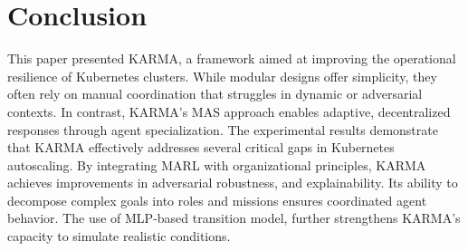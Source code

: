 \documentclass[conference]{IEEEtran}
\begin{document}

\section{Conclusion}
\label{sec:conclusion}

This paper presented KARMA, a framework aimed at improving the operational resilience of Kubernetes clusters. While modular designs offer simplicity, they often rely on manual coordination that struggles in dynamic or adversarial contexts. In contrast, KARMA’s MAS approach enables adaptive, decentralized responses through agent specialization.
The experimental results demonstrate that KARMA effectively addresses several critical gaps in Kubernetes autoscaling. By integrating MARL with organizational principles, KARMA achieves improvements in adversarial robustness, and explainability. Its ability to decompose complex goals into roles and missions ensures coordinated agent behavior. The use of MLP-based transition model, further strengthens KARMA's capacity to simulate realistic conditions.
%
%
\end{document}
